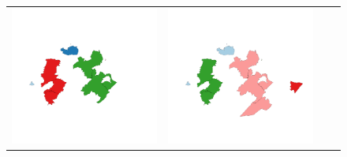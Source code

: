 \begin{figure}[p]
\begin{tabularx}{1\textwidth}{XXXX}
\includegraphics[width=1\linewidth]{images/ch6/contig/05}&
\includegraphics[width=1\linewidth]{images/ch6/contig/06}&

\end{tabularx}
\end{figure}
